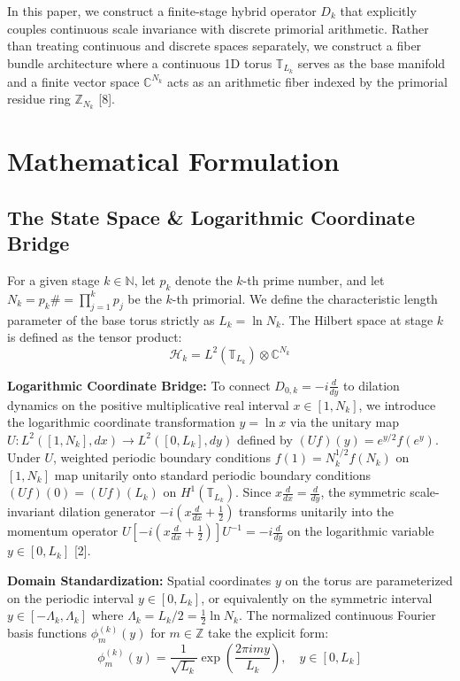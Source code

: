 \documentclass[11pt, a4paper]{article}
\begin{document}
In this paper, we construct a finite-stage hybrid operator $D_k$ that explicitly couples continuous scale invariance with discrete primorial arithmetic. Rather than treating continuous and discrete spaces separately, we construct a fiber bundle architecture where a continuous 1D torus $\mathbb{T}_{L_k}$ serves as the base manifold and a finite vector space $\mathbb{C}^{N_k}$ acts as an arithmetic fiber indexed by the primorial residue ring $\mathbb{Z}_{N_k}$ [8].

\section{Mathematical Formulation}

\subsection{The State Space \& Logarithmic Coordinate Bridge}
For a given stage $k \in \mathbb{N}$, let $p_k$ denote the $k$-th prime number, and let $N_k = p_k\# = \prod_{j=1}^k p_j$ be the $k$-th primorial. We define the characteristic length parameter of the base torus strictly as $L_k = \ln N_k$. The Hilbert space at stage $k$ is defined as the tensor product:
\[ \mathcal{H}_k = L^2(\mathbb{T}_{L_k}) \otimes \mathbb{C}^{N_k} \]

\textbf{Logarithmic Coordinate Bridge:} To connect $D_{0,k} = -i\frac{d}{dy}$ to dilation dynamics on the positive multiplicative real interval $x \in [1, N_k]$, we introduce the logarithmic coordinate transformation $y = \ln x$ via the unitary map $U: L^2([1, N_k], dx) \rightarrow L^2([0, L_k], dy)$ defined by $(Uf)(y) = e^{y/2}f(e^y)$. Under $U$, weighted periodic boundary conditions $f(1) = N_k^{1/2}f(N_k)$ on $[1, N_k]$ map unitarily onto standard periodic boundary conditions $(Uf)(0) = (Uf)(L_k)$ on $H^1(\mathbb{T}_{L_k})$. Since $x\frac{d}{dx} = \frac{d}{dy}$, the symmetric scale-invariant dilation generator $-i(x\frac{d}{dx} + \frac{1}{2})$ transforms unitarily into the momentum operator $U[-i(x\frac{d}{dx} + \frac{1}{2})]U^{-1} = -i\frac{d}{dy}$ on the logarithmic variable $y \in [0, L_k]$ [2].

\textbf{Domain Standardization:} Spatial coordinates $y$ on the torus are parameterized on the periodic interval $y \in [0, L_k]$, or equivalently on the symmetric interval $y \in [-\Lambda_k, \Lambda_k]$ where $\Lambda_k = L_k/2 = \frac{1}{2}\ln N_k$. The normalized continuous Fourier basis functions $\phi_m^{(k)}(y)$ for $m \in \mathbb{Z}$ take the explicit form:
\[ \phi_m^{(k)}(y) = \frac{1}{\sqrt{L_k}} \exp\left(\frac{2\pi i m y}{L_k}\right), \quad y \in [0, L_k] \]
\end{document}
